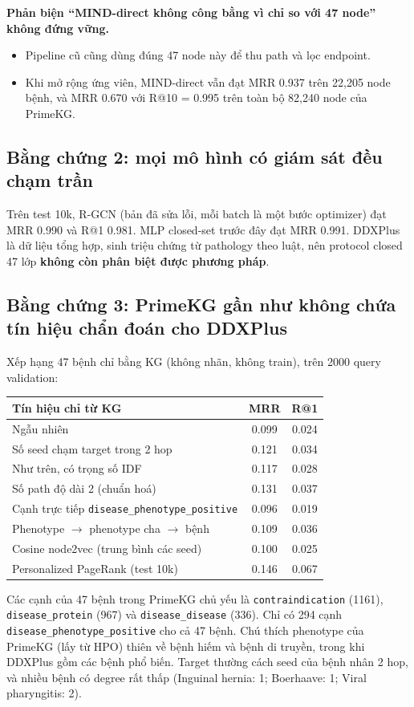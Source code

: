 \documentclass[11pt,a4paper]{article}
\theoremstyle{remark}
\begin{document}
\noindent\textbf{Phản biện ``MIND-direct không công bằng vì chỉ so với 47 node'' không đứng vững.}
\begin{itemize}[nosep]
  \item Pipeline cũ cũng dùng đúng 47 node này để thu path và lọc endpoint.
  \item Khi mở rộng ứng viên, MIND-direct vẫn đạt MRR 0.937 trên 22{,}205 node bệnh, và MRR 0.670 với R@10 = 0.995 trên toàn bộ 82{,}240 node của PrimeKG.
\end{itemize}

\subsection{Bằng chứng 2: mọi mô hình có giám sát đều chạm trần}
Trên test 10k, R-GCN (bản đã sửa lỗi, mỗi batch là một bước optimizer) đạt MRR 0.990 và R@1 0.981. MLP closed-set trước đây đạt MRR 0.991. DDXPlus là dữ liệu tổng hợp, sinh triệu chứng từ pathology theo luật, nên protocol closed 47 lớp \textbf{không còn phân biệt được phương pháp}.

\subsection{Bằng chứng 3: PrimeKG gần như không chứa tín hiệu chẩn đoán cho DDXPlus}
Xếp hạng 47 bệnh chỉ bằng KG (không nhãn, không train), trên 2000 query validation:

\begin{center}
\begin{tabular}{lcc}
\toprule
Tín hiệu chỉ từ KG & MRR & R@1 \\
\midrule
Ngẫu nhiên & 0.099 & 0.024 \\
Số seed chạm target trong 2 hop & 0.121 & 0.034 \\
Như trên, có trọng số IDF & 0.117 & 0.028 \\
Số path độ dài 2 (chuẩn hoá) & 0.131 & 0.037 \\
Cạnh trực tiếp \texttt{disease\_phenotype\_positive} & 0.096 & 0.019 \\
Phenotype $\to$ phenotype cha $\to$ bệnh & 0.109 & 0.036 \\
Cosine node2vec (trung bình các seed) & 0.100 & 0.025 \\
Personalized PageRank (test 10k) & 0.146 & 0.067 \\
\bottomrule
\end{tabular}
\end{center}

Các cạnh của 47 bệnh trong PrimeKG chủ yếu là \texttt{contraindication} (1161), \texttt{disease\_protein} (967) và \texttt{disease\_disease} (336). Chỉ có 294 cạnh \texttt{disease\_phenotype\_positive} cho cả 47 bệnh. Chú thích phenotype của PrimeKG (lấy từ HPO) thiên về bệnh hiếm và bệnh di truyền, trong khi DDXPlus gồm các bệnh phổ biến. Target thường cách seed của bệnh nhân 2 hop, và nhiều bệnh có degree rất thấp (Inguinal hernia: 1; Boerhaave: 1; Viral pharyngitis: 2).
\end{document}
